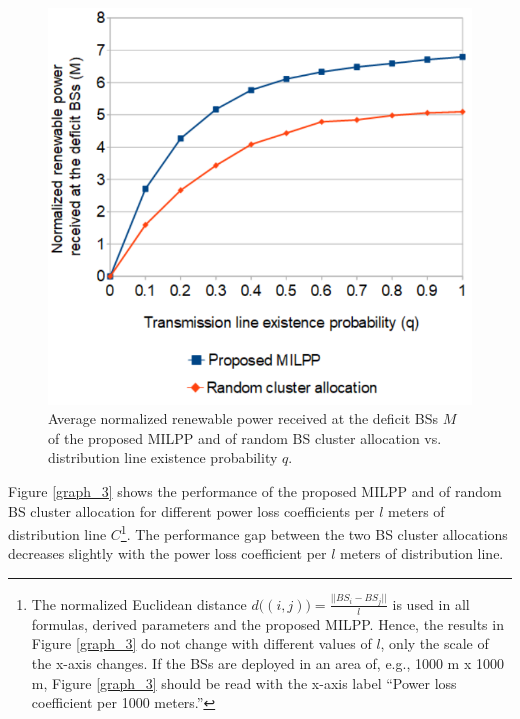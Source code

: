 \begin{figure}[H]
\centering
\includegraphics[width=0.75\columnwidth]{pictures/graph_2}
\caption{Average normalized renewable power received at the deficit BSs $M$ of the proposed MILPP and of random BS cluster allocation vs. distribution line existence probability $q$.\label{graph_2}}
\end{figure}






Figure \ref{graph_3} shows the performance of the proposed MILPP and of random BS cluster allocation for different power loss coefficients per $l$ meters of distribution line $C$\footnote{The normalized Euclidean distance $d\big((i,j)\big)=\frac{||BS_i - BS_j||}{l}$ is used in all formulas, derived parameters and  the proposed MILPP. Hence, the results in Figure \ref{graph_3} do not change with different values of $l$, only the scale of the x-axis changes. If the BSs  are deployed in an area of, e.g., 1000 m x 1000 m, Figure \ref{graph_3} should be read with the x-axis label “Power loss coefficient per 1000 meters.”}. 
The performance gap between the two BS cluster allocations decreases slightly with the power loss coefficient per $l$ meters of distribution line. 


